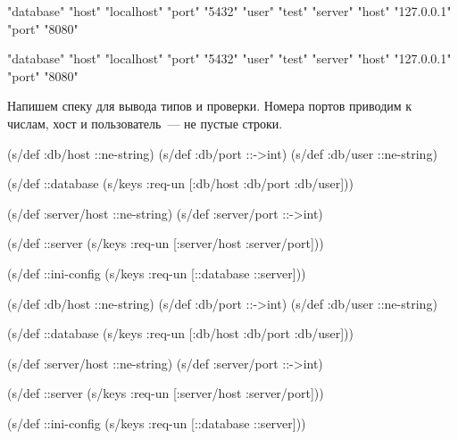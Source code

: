 \ifx\DEVICETYPE\MOBILE

\begin{english}
  \begin{clojure}
{"database" {"host" "localhost"
             "port" "5432"
             "user" "test"}
 "server" {"host" "127.0.0.1"
           "port" "8080"}}
  \end{clojure}
\end{english}

\else

\begin{english}
  \begin{clojure}
{"database" {"host" "localhost" "port" "5432" "user" "test"}
 "server" {"host" "127.0.0.1" "port" "8080"}}
  \end{clojure}
\end{english}

\fi

Напишем спеку для вывода типов и проверки. Номера портов приводим к числам, хост
и пользователь~--- не пустые строки.

\ifx\DEVICETYPE\MOBILE

\begin{english}
  \begin{clojure}
(s/def :db/host ::ne-string)
(s/def :db/port ::->int)
(s/def :db/user ::ne-string)

(s/def ::database
  (s/keys :req-un
    [:db/host :db/port :db/user]))

(s/def :server/host ::ne-string)
(s/def :server/port ::->int)

(s/def ::server
  (s/keys :req-un
    [:server/host :server/port]))

(s/def ::ini-config
  (s/keys :req-un [::database ::server]))
  \end{clojure}
\end{english}

\else

\begin{english}
  \begin{clojure}
(s/def :db/host ::ne-string)
(s/def :db/port ::->int)
(s/def :db/user ::ne-string)

(s/def ::database
  (s/keys :req-un [:db/host :db/port :db/user]))

(s/def :server/host ::ne-string)
(s/def :server/port ::->int)

(s/def ::server
  (s/keys :req-un [:server/host :server/port]))

(s/def ::ini-config
  (s/keys :req-un [::database ::server]))
  \end{clojure}
\end{english}

